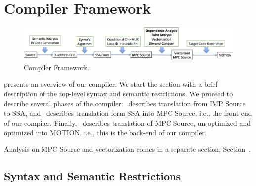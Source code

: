 

\section{\bf Compiler Framework}
\label{sec:compiler}



\begin{figure}
  \includegraphics[width=0.9\linewidth]{figs_paper_SIMD/compiler_framework.png}
  \caption{Compiler Framework. }
  \label{fig:compiler_framework}
\end{figure}

 presents an overview of our compiler.
We start the section with a brief description of the top-level syntax and semantic restrictions.
We proceed to describe several phases of the compiler:~
describes translation from IMP Source to SSA, and~
describes translation form SSA into MPC Source, i.e., the front-end of our compiler.
Finally,~ describes translation of MPC Source, un-optimized and
optimized into MOTION, i.e., this is the back-end of our compiler.

Analysis on MPC Source and vectorization comes in a separate section, Section~.

\subsection{Syntax and Semantic Restrictions}
\label{sec:syntax}

